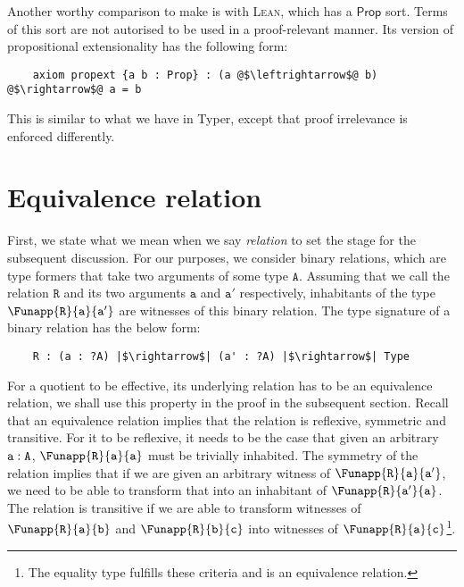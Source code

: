 \documentclass[12pt,twoside,maitrise]{dms}
\theoremstyle{definition}
\numberwithin{equation}{section}
\numberwithin{table}{chapter}
\numberwithin{figure}{chapter}
\newcommand\kw[1] {\textsf{#1}}
\newcommand\id[1] {\texttt{#1}}
\def\Lean{\textsc{Lean}\xspace}
\begin{document}
Another worthy comparison to make is with \Lean{}, which has a $\kw{Prop}$ sort.
Terms of this sort are not autorised to be used in a proof-relevant manner. Its
version of propositional extensionality has the following form:

\begin{verbatim}
    axiom propext {a b : Prop} : (a @$\leftrightarrow$@ b) @$\rightarrow$@ a = b
\end{verbatim}

This is similar to what we have in Typer, except that proof irrelevance is
enforced differently.

\section{Equivalence relation}

First, we state what we mean when we say \emph{relation} to set the stage for
the subsequent discussion. For our purposes, we consider binary relations, which
are type formers that take two arguments of some type $\id{A}$. Assuming that we
call the relation $\id{R}$ and its two arguments $\id{a}$ and $\id{a}'$
respectively, inhabitants of the type $\Funapp{\id{R}}{\id{a}}{\id{a}'}$ are
witnesses of this binary relation. The type signature of a binary relation has
the below form:

\begin{verbatim}
    R : (a : ?A) |$\rightarrow$| (a' : ?A) |$\rightarrow$| Type
\end{verbatim}

For a quotient to be effective, its underlying relation has to be an equivalence
relation, we shall use this property in the proof in the subsequent section.
Recall that an equivalence relation implies that the relation is reflexive,
symmetric and transitive. For it to be reflexive, it needs to be the case that
given an arbitrary $\oftype{\id{a}}{\id{A}}$, $\Funapp{\id{R}}{\id{a}}{\id{a}}$
must be trivially inhabited. The symmetry of the relation implies that if we are
given an arbitrary witness of $\Funapp{\id{R}}{\id{a}}{\id{a}'}$, we need to be
able to transform that into an inhabitant of $\Funapp{\id{R}}{\id{a}'}{\id{a}}$.
The relation is transitive if we are able to transform witnesses of
$\Funapp{\id{R}}{\id{a}}{\id{b}}$ and $\Funapp{\id{R}}{\id{b}}{\id{c}}$ into
witnesses of $\Funapp{\id{R}}{\id{a}}{\id{c}}$\footnote{The equality type
fulfills these criteria and is an equivalence relation.}.
\end{document}
